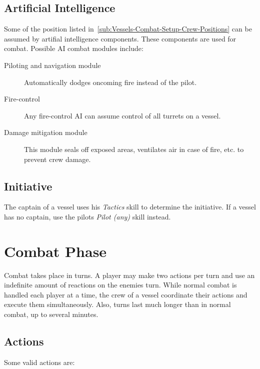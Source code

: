 \subsection{Artificial Intelligence}
\label{sub:Vessels-Combat-Setup-Artificial-Intelligence}

Some of the position listed in~\ref{sub:Vessels-Combat-Setup-Crew-Positions} can be assumed by artifial intelligence components. These components are used for combat. Possible AI combat modules include:

\begin{description}
  \item[Piloting and navigation module]
  Automatically dodges oncoming fire instead of the pilot.
  \item[Fire-control]
  Any fire-control AI can assume control of all turrets on a vessel.
  \item[Damage mitigation module] This module seals off exposed areas, ventilates air in case of fire, etc. to prevent crew damage.
\end{description}

\subsection{Initiative}
\label{sub:Vessels-Combat-Setup-Initiative}

The captain of a vessel uses his \emph{Tactics} skill to determine the initiative. If a vessel has no captain, use the pilots \emph{Pilot (any)} skill instead.

\section{Combat Phase}
\label{sec:Vessels-Combat-Combat-Phase}

Combat takes place in turns. A player may make two actions per turn and use an indefinite amount of reactions on the enemies turn. While normal combat is handled each player at a time, the crew of a vessel coordinate their actions and execute them simultaneously. Also, turns last much longer than in normal combat, up to several minutes.

\subsection{Actions}
\label{sub:Actions}

Some valid actions are:

